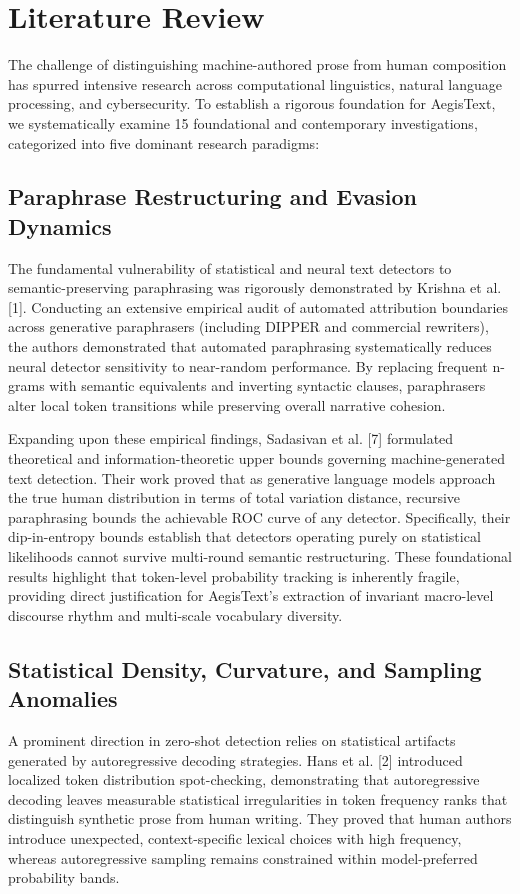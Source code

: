 \documentclass[conference]{IEEEtran}
\begin{document}
\section{Literature Review}
The challenge of distinguishing machine-authored prose from human composition has spurred intensive research across computational linguistics, natural language processing, and cybersecurity. To establish a rigorous foundation for AegisText, we systematically examine 15 foundational and contemporary investigations, categorized into five dominant research paradigms:

\subsection{Paraphrase Restructuring and Evasion Dynamics}
The fundamental vulnerability of statistical and neural text detectors to semantic-preserving paraphrasing was rigorously demonstrated by Krishna et al. [1]. Conducting an extensive empirical audit of automated attribution boundaries across generative paraphrasers (including DIPPER and commercial rewriters), the authors demonstrated that automated paraphrasing systematically reduces neural detector sensitivity to near-random performance. By replacing frequent n-grams with semantic equivalents and inverting syntactic clauses, paraphrasers alter local token transitions while preserving overall narrative cohesion.

Expanding upon these empirical findings, Sadasivan et al. [7] formulated theoretical and information-theoretic upper bounds governing machine-generated text detection. Their work proved that as generative language models approach the true human distribution in terms of total variation distance, recursive paraphrasing bounds the achievable ROC curve of any detector. Specifically, their dip-in-entropy bounds establish that detectors operating purely on statistical likelihoods cannot survive multi-round semantic restructuring. These foundational results highlight that token-level probability tracking is inherently fragile, providing direct justification for AegisText's extraction of invariant macro-level discourse rhythm and multi-scale vocabulary diversity.

\subsection{Statistical Density, Curvature, and Sampling Anomalies}
A prominent direction in zero-shot detection relies on statistical artifacts generated by autoregressive decoding strategies. Hans et al. [2] introduced localized token distribution spot-checking, demonstrating that autoregressive decoding leaves measurable statistical irregularities in token frequency ranks that distinguish synthetic prose from human writing. They proved that human authors introduce unexpected, context-specific lexical choices with high frequency, whereas autoregressive sampling remains constrained within model-preferred probability bands.
\end{document}
